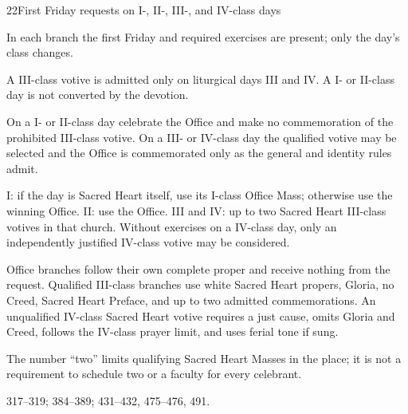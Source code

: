 \begin{casefile}{22}{First Friday requests on I-, II-, III-, and IV-class days}
\item[Calendar facts] In each branch the first Friday and required exercises are present; only the day's class changes.
\item[Ranks and rows] A III-class votive is admitted only on liturgical days III and IV.  A I- or II-class day is not converted by the devotion.
\item[Impeded item] On a I- or II-class day celebrate the Office and make no commemoration of the prohibited III-class votive.  On a III- or IV-class day the qualified votive may be selected and the Office is commemorated only as the general and identity rules admit.
\item[Mass category] I: if the day is Sacred Heart itself, use its I-class Office Mass; otherwise use the winning Office.  II: use the Office.  III and IV: up to two Sacred Heart III-class votives in that church.  Without exercises on a IV-class day, only an independently justified IV-class votive may be considered.
\item[Assembly] Office branches follow their own complete proper and receive nothing from the request.  Qualified III-class branches use white Sacred Heart propers, Gloria, no Creed, Sacred Heart Preface, and up to two admitted commemorations.  An unqualified IV-class Sacred Heart votive requires a just cause, omits Gloria and Creed, follows the IV-class prayer limit, and uses ferial tone if sung.
\item[Boundary] The number “two” limits qualifying Sacred Heart Masses in the place; it is not a requirement to schedule two or a faculty for every celebrant.
\item[Rubric locus] 317--319; 384--389; 431--432, 475--476, 491.
\end{casefile}

